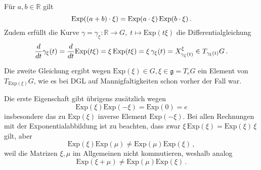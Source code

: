 \documentclass[../H_Analysis_main.tex]{subfiles}
\begin{document}
\begin{lemma}
Für $a, b \in \mathbb{R}$ gilt
\begin{equation}\label{eq:expabbgruppe}
\text{Exp}\qty((a + b) \cdot \xi) = \text{Exp}(a \cdot \xi) \, \text{Exp}(b \cdot \xi) \, .
\end{equation}
Zudem erfüllt die Kurve $\gamma = \gamma_\xi: \mathbb{R} \rightarrow G, \; t \mapsto \text{Exp}(t\xi)$ die Differentialgleichung
\begin{equation}\label{eq:dglexpabb2}
\dv{t}\gamma_\xi(t) = \dv{t} \text{Exp}(t\xi) = \xi \, \text{Exp}(t\xi) = \xi \, \gamma_\xi(t) = X^\xi_{\gamma_\xi(t)} \in T_{\gamma_\xi(t)} G \, .
\end{equation}
\end{lemma}
Die zweite Gleichung ergibt wegen $\text{Exp}(\xi) \in G, \xi \in \mathfrak{g} = T_e G$ ein Element von $T_{\text{Exp}(\xi)} G$, wie es bei DGL auf Mannigfaltigkeiten schon vorher der Fall war.

Die erste Eigenschaft gibt übrigens zusätzlich wegen
\begin{equation}
\text{Exp}(\xi) \text{Exp}(-\xi) = \text{Exp}(0) = e
\end{equation}
insbesondere das zu $\text{Exp}(\xi)$ inverse Element $\text{Exp}(-\xi)$. Bei allen Rechnungen mit der Exponentialabbildung ist zu beachten, dass zwar $\xi \, \text{Exp}(\xi) = \text{Exp}(\xi) \, \xi$ gilt, aber
\begin{equation}
\text{Exp}(\xi) \text{Exp}(\mu) \neq \text{Exp}(\mu) \text{Exp}(\xi) \, ,
\end{equation}
weil die Matrizen $\xi, \mu$ im Allgemeinen nicht kommutieren, weshalb analog
\begin{equation}
\text{Exp}(\xi + \mu) \neq \text{Exp}(\mu) \text{Exp}(\xi) \, .
\end{equation}
\end{document}
